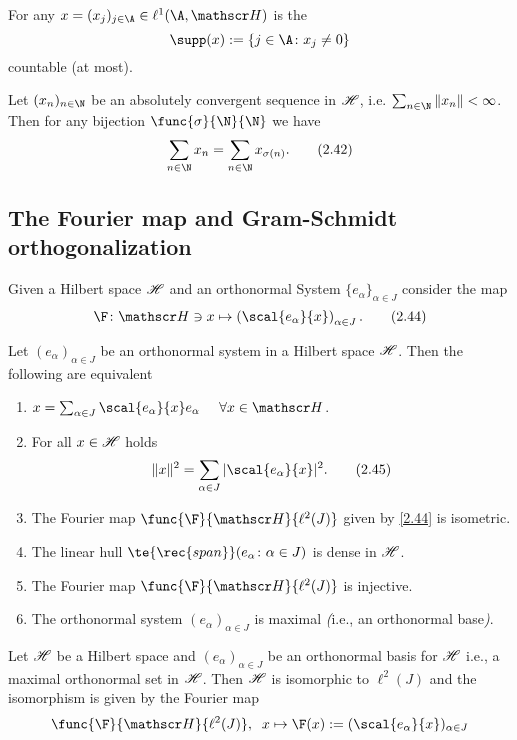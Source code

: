  For any $x=(x_j)_{j\in\A}\in\ell^1(\A,\H)$ is the 
\[\supp(x):=\{j\in\A\colon x_j\neq0\}\]
countable (at most).

 Let $(x_n)_{n\in\N}$ be an absolutely convergent sequence in $\mathscr{H}$, i.e. $\sum_{n\in\N}\|x_n\|<\infty$. Then for any bijection $\func{\sigma}{\N}{\N}$ we have
\[\sum_{n\in\N}x_n=\sum_{n\in\N}x_{\sigma(n)}.\tag{2.42}\label{2.42}\]

\subsection{The Fourier map and Gram-Schmidt orthogonalization}
Given a Hilbert space $\mathscr{H}$ and an orthonormal System $\{e_\alpha\}_{\alpha\in J}$ consider the map
\[\F\colon\H\ni x\mapsto\left(\scal{e_\alpha}{x}\right)_{\alpha\in J}.\tag{2.44}\label{2.44}\]
\begin{thm}\label{ii.20}
    Let $(e_\alpha)_{\alpha\in J}$ be an orthonormal system in a Hilbert space $\mathscr{H}$. Then the following are equivalent
    \begin{enumerate}[label=\alph*)]
        \item $x=\sum_{\alpha\in J}\scal{e_\alpha}{x}e_\alpha\;\;\;\;\;\forall x\in\H$.\label{ii.20.a}
        \item For all $x\in\mathscr{H}$  holds
        \[\|x\|^2=\sum_{\alpha\in J}|\scal{e_\alpha}{x}|^2.\tag{2.45}\label{2.45}\]\label{ii.20.b}
        \item The Fourier map $\func{\F}{\H}{\ell^2(J)}$ given by \eqref{2.44} is isometric.\label{ii.20.c}
        \item The linear hull $\te{\rec{span}}(e_\alpha\colon{\alpha\in J})$ is dense in $\mathscr{H}$.\label{ii.20.d}
        \item The Fourier map $\func{\F}{\H}{\ell^2(J)}$ is injective.\label{ii.20.e}
        \item The orthonormal system $(e_\alpha)_{\alpha\in J}$ is maximal \emph{(}i.e., an orthonormal base\emph{)}.\label{ii.20.f}
    \end{enumerate}
\end{thm}

\begin{cor}\label{ii.21}
    Let $\mathscr{H}$ be a Hilbert space and $(e_\alpha)_{\alpha\in J}$ be an orthonormal basis for $\mathscr{H}$ \rec{(}i.e., a maximal orthonormal set in $\mathscr{H}$\rec{)}. Then $\mathscr{H}$ is isomorphic to $\ell^2(J)$ and the isomorphism is given by the Fourier map
    \[\func{\F}{\H}{\ell^2(J)},\;\; x\mapsto\F(x):=(\scal{e_\alpha}{x})_{\alpha\in J}\]
\end{cor}

